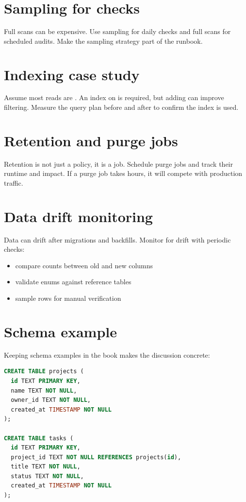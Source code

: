 \section{Sampling for checks}
Full scans can be expensive.
Use sampling for daily checks and full scans for scheduled audits.
Make the sampling strategy part of the runbook.

\section{Indexing case study}
Assume most reads are .
An index on  is required, but adding  can improve filtering.
Measure the query plan before and after to confirm the index is used.

\section{Retention and purge jobs}
Retention is not just a policy, it is a job.
Schedule purge jobs and track their runtime and impact.
If a purge job takes hours, it will compete with production traffic.

\section{Data drift monitoring}
Data can drift after migrations and backfills.
Monitor for drift with periodic checks:
\begin{itemize}[nosep]
  \item compare counts between old and new columns
  \item validate enums against reference tables
  \item sample rows for manual verification
\end{itemize}

\section{Schema example}
Keeping schema examples in the book makes the discussion concrete:
\begin{lstlisting}[language=SQL]
CREATE TABLE projects (
  id TEXT PRIMARY KEY,
  name TEXT NOT NULL,
  owner_id TEXT NOT NULL,
  created_at TIMESTAMP NOT NULL
);

CREATE TABLE tasks (
  id TEXT PRIMARY KEY,
  project_id TEXT NOT NULL REFERENCES projects(id),
  title TEXT NOT NULL,
  status TEXT NOT NULL,
  created_at TIMESTAMP NOT NULL
);
\end{lstlisting}

